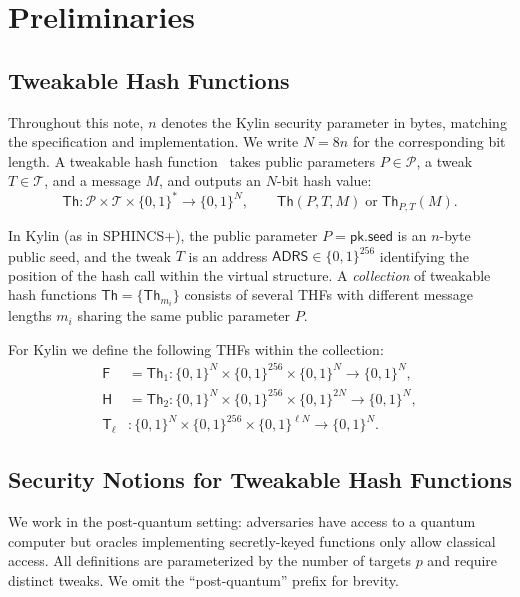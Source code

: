\documentclass[11pt,a4paper]{article}
\newcommand{\F}{\mathsf{F}}
\newcommand{\Hfunc}{\mathsf{H}}
\newcommand{\Th}{\mathsf{Th}}
\newcommand{\T}{\mathsf{T}}
\newcommand{\bits}{\{0,1\}}
\newcommand{\pk}{\mathsf{pk}}
\newcommand{\seed}{\mathsf{seed}}
\newcommand{\ADRS}{\mathsf{ADRS}}
\newcommand{\Nbits}{N}
\begin{document}
\section{Preliminaries}
\label{sec:prelim}

\subsection{Tweakable Hash Functions}

Throughout this note, $n$ denotes the Kylin security parameter in bytes, matching the specification and implementation. We write $\Nbits = 8n$ for the corresponding bit length. A tweakable hash function~\cite{BHK+19} takes public parameters $P \in \mathcal{P}$, a tweak $T \in \mathcal{T}$, and a message $M$, and outputs an $\Nbits$-bit hash value:
\[
\Th : \mathcal{P} \times \mathcal{T} \times \bits^* \to \bits^\Nbits, \qquad
\Th(P, T, M) \;\text{or}\; \Th_{P,T}(M).
\]

In Kylin (as in SPHINCS+), the public parameter $P = \pk.\seed$ is an $n$-byte public seed, and the tweak $T$ is an address $\ADRS \in \bits^{256}$ identifying the position of the hash call within the virtual structure. A \emph{collection} of tweakable hash functions $\boldsymbol{\Th} = \{\Th_{m_i}\}$ consists of several THFs with different message lengths $m_i$ sharing the same public parameter $P$.

For Kylin we define the following THFs within the collection:
\begin{align*}
\F &= \Th_1 :
\bits^\Nbits \times \bits^{256} \times \bits^\Nbits
\to \bits^\Nbits,\\
\Hfunc &= \Th_2 :
\bits^\Nbits \times \bits^{256} \times \bits^{2\Nbits}
\to \bits^\Nbits,\\
\T_\ell &:
\bits^\Nbits \times \bits^{256} \times \bits^{\ell \Nbits}
\to \bits^\Nbits.
\end{align*}

\subsection{Security Notions for Tweakable Hash Functions}

We work in the post-quantum setting: adversaries have access to a quantum computer but oracles implementing secretly-keyed functions only allow classical access. All definitions are parameterized by the number of targets $p$ and require distinct tweaks. We omit the ``post-quantum'' prefix for brevity.
\end{document}

